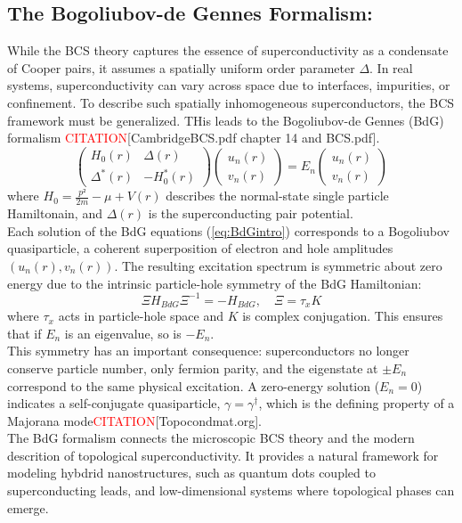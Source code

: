 \documentclass[11pt, letterpaper, titlepage]{article}
\begin{document}
\subsection{The Bogoliubov-de Gennes Formalism:}
While the BCS theory captures the essence of superconductivity as a condensate of Cooper pairs, it assumes a spatially uniform order parameter $Δ$. In real systems, superconductivity can vary across space due to interfaces, impurities, or confinement. To describe such spatially inhomogeneous superconductors, the BCS framework must be generalized. THis leads to the Bogoliubov-de Gennes (BdG) formalism \textcolor{red}{CITATION}[CambridgeBCS.pdf chapter 14 and BCS.pdf].\\
\begin{equation}
  \begin{pmatrix}
  H_0(r) & Δ(r) \\
  Δ^{*}(r) & -H_0^{*}(r)
  \end{pmatrix}
  \begin{pmatrix}
  u_n(r) \\
  v_n(r)
  \end{pmatrix}= E_n
  \begin{pmatrix}
  u_n(r) \\
  v_n(r)
  \end{pmatrix}
  \label{eq:BdGintro}
\end{equation}
where $H_0 = \frac{p²}{2m}-μ + V(r)$ describes the normal-state single particle Hamiltonain, and $Δ(r)$ is the superconducting pair potential.\\ 
Each solution of the BdG equations (\ref{eq:BdGintro}) corresponds to a Bogoliubov quasiparticle, a coherent superposition of electron and hole amplitudes $(u_n(r), v_n(r))$. The resulting excitation spectrum is symmetric about zero energy due to the intrinsic particle-hole symmetry of the BdG Hamiltonian:
\begin{equation}
  Ξ H_{BdG} Ξ^{-1} = -H_{BdG}, \quad Ξ = τ_x K
\end{equation}
where $τ_x$ acts in particle-hole space and $K$ is complex conjugation. This ensures that if $E_n$ is an eigenvalue, so is $-E_n$.\\
This symmetry has an important consequence: superconductors no longer conserve particle number, only fermion parity, and the eigenstate at $± E_n$ correspond to the same physical excitation. A zero-energy solution ($E_n = 0$) indicates a self-conjugate quasiparticle, $γ = γ^{†}$, which is the defining property of a Majorana mode\textcolor{red}{CITATION}[Topocondmat.org].\\
The BdG formalism connects the microscopic BCS theory and the modern descrition of topological superconductivity. It provides a natural framework for modeling hybdrid nanostructures, such as quantum dots coupled to superconducting leads, and low-dimensional systems where topological phases can emerge.  \\
\end{document}
